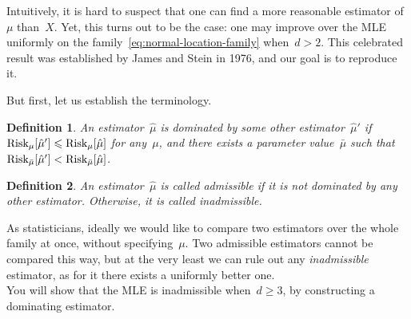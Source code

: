 \documentclass[11pt]{article}
\newtheorem{definition}{Definition}%
\newcommand{\Risk}{\textup{Risk}}
\newcommand{\leqs}{\leqslant}
\newcommand{\geqs}{\geqslant}
\renewcommand{\le}{\leqs}
\renewcommand{\ge}{\geqs}
\begin{document}
Intuitively, it is hard to suspect that one can find a more reasonable estimator of~$\mu$ than~$X$.
Yet, this turns out to be the case: one may improve over the MLE uniformly on the family~\eqref{eq:normal-location-family} when~$d > 2$. 
This celebrated result was established by James and Stein in 1976, and our goal is to reproduce it.

But first, let us establish the terminology.

\begin{definition}
An estimator~$\hat\mu$ is {\em dominated} by some other estimator~$\hat \mu'$ if~$\Risk_{\mu}[\hat\mu'] \le \Risk_{\mu}[\hat\mu]$ for any~$\mu$, and there exists a parameter value~$\bar\mu$ such that~$\Risk_{\bar\mu}[\hat\mu'] < \Risk_{\bar\mu}[\hat\mu]$.
\end{definition}

\begin{definition}
An estimator~$\hat\mu$ is called {\em admissible} if it is not dominated by any other estimator. Otherwise, it is called {\em inadmissible}.
\end{definition}

As statisticians, ideally we would like to compare two estimators over the whole family at once, without specifying~$\mu$. %
Two admissible estimators cannot be compared this way, but at the very least we can rule out any {\em inadmissible} estimator, as for it there exists a uniformly better one.\\

You will show that the MLE is inadmissible when~$d \ge 3$, by constructing a dominating estimator.



\end{document}

